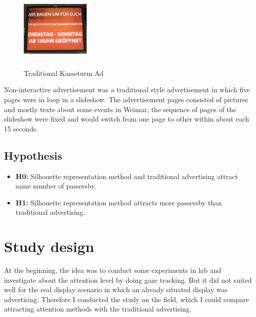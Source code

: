 \begin{figure}
  \vspace{-30pt}
  \begin{center}
    \includegraphics[width=0.3\textwidth,height=40mm]{Figures/3/non-interactive}
  \end{center}
  \vspace{-20pt}
  \caption{Traditional Kasseturm Ad }          
  \label{fig:Attraction_silhouette}
  \vspace{-20pt}
\end{figure} 
Non-interactive advertisement was a traditional style advertisement in which five pages were in loop in a slideshow. The advertisement pages consisted of pictures and mostly texts about some events in Weimar, the sequence of pages of the slideshow were fixed and would switch from one page to other within about each 15 seconds.
\break

\subsection{Hypothesis}

\begin{itemize}
\item \textbf{H0:} Silhouette representation method and traditional advertising attract same number of passersby.
\item \textbf{H1:} Silhouette representation method attracts more passersby than traditional advertising.

\end{itemize}



\section{Study design}
At the beginning, the idea was to conduct some experiments in lab and investigate about the attention level by doing gaze tracking. But it did not suited well for the real display scenario in which an already situated display was advertising. Therefore I conducted the study on the field, which I could compare attracting attention methods with the traditional advertising. 

